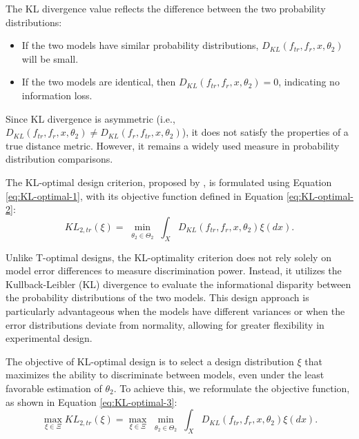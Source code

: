 \hspace*{8mm} The KL divergence value reflects the difference between the two probability distributions:
\begin{itemize}
\item If the two models have similar probability distributions, $D_{KL}(f_{tr},f_r,x,\theta_2)$ will be small.
\item If the two models are identical, then $D_{KL}(f_{tr},f_r,x,\theta_2) = 0$, indicating no information loss.
\end{itemize}

\hspace*{8mm} Since KL divergence is asymmetric (i.e., $D_{KL}(f_{tr},f_r,x,\theta_2) \neq D_{KL}(f_r,f_{tr},x,\theta_2)$), it does not satisfy the properties of a true distance metric. However, it remains a widely used measure in probability distribution comparisons.

\hspace*{8mm} The KL-optimal design criterion, proposed by \cite{lopez2007optimal}, is formulated using Equation \eqref{eq:KL-optimal-1}, with its objective function defined in Equation \eqref{eq:KL-optimal-2}:
\begin{equation}\label{eq:KL-optimal-2}
KL_{2,tr}(\xi)=\min_{\substack{\theta_2\in \Theta_2}}\int_{X}D_{KL}(f_{tr},f_r,x,\theta_2) \xi(dx).
\end{equation}

\hspace*{8mm} Unlike T-optimal designs, the KL-optimality criterion does not rely solely on model error differences to measure discrimination power. Instead, it utilizes the Kullback-Leibler (KL) divergence to evaluate the informational disparity between the probability distributions of the two models. This design approach is particularly advantageous when the models have different variances or when the error distributions deviate from normality, allowing for greater flexibility in experimental design.

\hspace*{8mm} The objective of KL-optimal design is to select a design distribution $\xi$ that maximizes the ability to discriminate between models, even under the least favorable estimation of $\theta_2$. To achieve this, we reformulate the objective function, as shown in Equation \eqref{eq:KL-optimal-3}:
\begin{equation}\label{eq:KL-optimal-3}
\max_{\xi\in \Xi} KL_{2,tr}(\xi)=\max_{\xi\in \Xi} \min_{\substack{\theta_2\in \Theta_2}}\int_{X}D_{KL}(f_{tr},f_r,x,\theta_2) \xi(dx).
\end{equation}

